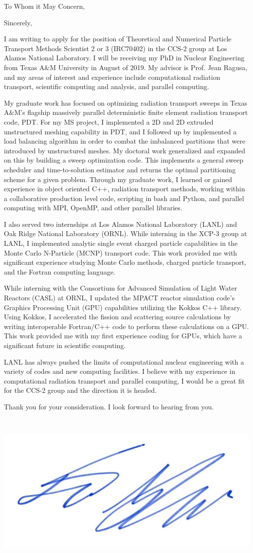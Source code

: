 \documentclass[11pt,letterpaper,roman]{moderncv}        %
\makeatletter
\renewcommand*{\makeletterclosing}{
	\@closing\\[0em]%
	{\includegraphics[scale=0.1]{../signature_ghaddar.jpg}
		\par
		\bfseries \@firstname~\@lastname}%
		\\
	\ifthenelse{\isundefined{\@enclosure}}{}{%
		\vfill%
		{\color{color2}\itshape\enclname: \@enclosure}}}
\makeatother
\begin{document}
\date{\today}
\opening{To Whom it May Concern,}
\closing{Sincerely,}

\makelettertitle

I am writing to apply for the position of 	Theoretical and Numerical Particle Transport Methods Scientist 2 or 3 (IRC70402) in the CCS-2 group at Los Alamos National Laboratory. I will be receiving my PhD in Nuclear Engineering from Texas A\&M University in August of 2019. My advisor is Prof. Jean Ragusa, and my areas of interest and experience include computational radiation transport, scientific computing and analysis, and parallel computing. 

My graduate work has focused on optimizing radiation transport sweeps in Texas A\&M's flagship massively parallel deterministic finite element radiation transport code, PDT. For my MS project, I implemented a 2D and 2D extruded unstructured meshing capability in PDT, and I followed up by implemented a load balancing algorithm in order to combat the imbalanced partitions that were introduced by unstructured meshes. My doctoral work generalized and expanded on this by building a sweep optimization code. This implements a general sweep scheduler and time-to-solution estimator and returns the optimal partitioning scheme for a given problem. Through my graduate work, I learned or gained experience in object oriented C++, radiation transport methods, working within a collaborative production level code, scripting in bash and Python, and parallel computing with MPI, OpenMP, and other parallel libraries.

I also served two internships at Los Alamos National Laboratory (LANL) and Oak Ridge National Laboratory (ORNL). While interning in the XCP-3 group at LANL, I implemented analytic single event charged particle capabilities in the Monte Carlo N-Particle (MCNP) transport code. This work provided me with significant experience studying Monte Carlo methods, charged particle transport, and the Fortran computing language. 

While interning with the Consortium for Advanced Simulation of Light Water Reactors (CASL) at ORNL, I updated the MPACT reactor simulation code's Graphics Processing Unit (GPU) capabilities utilizing the Kokkos C++ library. Using Kokkos, I accelerated the fission and scattering source calculations by writing interoperable Fortran/C++ code to perform these calculations on a GPU. This work provided me with my first experience coding for GPUs, which have a significant future in scientific computing.

LANL has always pushed the limits of computational nuclear engineering with a variety of codes and new computing facilities. I believe with my experience in computational radiation transport and parallel computing, I would be a great fit for the CCS-2 group and the direction it is headed. 

Thank you for your consideration. I look forward to hearing from you.

\makeletterclosing
\end{document}
